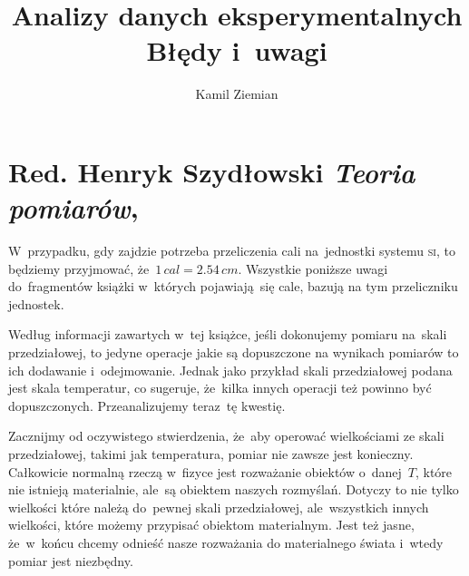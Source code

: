 \documentclass[a4paper,11pt]{article}
\title{Analizy danych eksperymentalnych \\
  {\Large Błędy i~uwagi}}
\author{Kamil Ziemian}
\numberwithin{equation}{section}
\begin{document}





\maketitle





\section{Red. Henryk Szydłowski \textit{Teoria pomiarów},
  \cite{RedSzydlowskiTeoriaPomiarow1981}}


\vspace{0em}



\vspace{0em}


\noindent
W~przypadku, gdy zajdzie potrzeba przeliczenia cali na~jednostki systemu
\textsc{si}, to będziemy przyjmować, że~$1 \, \si{cal} = 2.54 \, \si{cm}$.
Wszystkie poniższe uwagi do~fragmentów książki w~których pojawiają~się cale,
bazują na tym przeliczniku jednostek.

\VerSpaceFour






\vspace{0em}


\noindent
{} Według informacji zawartych w~tej książce, jeśli dokonujemy pomiaru
na~skali przedziałowej, to jedyne operacje jakie są dopuszczone na wynikach
pomiarów to ich dodawanie i~odejmowanie. Jednak jako przykład skali
przedziałowej podana jest skala temperatur, co sugeruje, że~kilka innych
operacji też powinno być dopuszczonych. Przeanalizujemy teraz~tę kwestię.

Zacznijmy od oczywistego stwierdzenia, że~aby operować wielkościami ze skali
przedziałowej, takimi jak temperatura, pomiar nie zawsze jest konieczny.
Całkowicie normalną rzeczą w~fizyce jest rozważanie obiektów o~danej~$T$,
które nie istnieją materialnie, ale~są obiektem naszych rozmyślań. Dotyczy
to nie tylko wielkości które należą do~pewnej skali przedziałowej,
ale~wszystkich innych wielkości, które możemy przypisać obiektom materialnym.
Jest też jasne, że~w~końcu chcemy odnieść nasze rozważania do materialnego
świata i~wtedy pomiar jest niezbędny.
\end{document}
